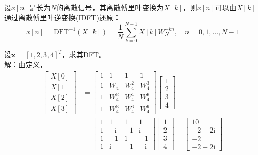 \begin{theorem}[离散傅里叶反演公式]\label{thm:DFT_inv}
    设$x[n]$是长为$N$的离散信号，其离散傅里叶变换为$X[k]$，则$x[n]$可以由$X[k]$通过离散傅里叶逆变换(IDFT)还原：
    \[x[n]=\mathrm{DFT}^{-1}(X[k])=\frac{1}{N}\sum_{k=0}^{N-1}X[k]W_N^{-kn},\quad n=0,1,\dots,N-1\]
\end{theorem}

\begin{example}
    设$\mathbf{x}=[1,2,3,4]^T$，求其DFT。\\
    解：由定义，
    \begin{align*}
        \begin{bmatrix}
            X[0]  \\
            X[1]  \\
            X[2]  \\
            X[3]
        \end{bmatrix}&=\begin{bmatrix}1 & 1 & 1 & 1 \\
        1 & W_4 & W_4^{2} & W_4^{3} \\
        1 & W_4^{2} & W_4^{4} & W_4^{6} \\
        1 & W_4^{3} & W_4^{6} & W_4^{9}
        \end{bmatrix}\begin{bmatrix}
            1  \\
            2  \\
            3  \\
            4
        \end{bmatrix}\\
        &=\begin{bmatrix}
        1 & 1 & 1 & 1 \\
        1 & -\mathrm{i} & -1 & \mathrm{i} \\
        1 & -1 & 1 & -1 \\
        1 & \mathrm{i} & -1 & -\mathrm{i}
        \end{bmatrix}\begin{bmatrix}
            1  \\
            2  \\
            3  \\
            4
        \end{bmatrix}=\begin{bmatrix}
            10  \\
            -2+2\mathrm{i}  \\
            -2  \\
            -2-2\mathrm{i}
        \end{bmatrix}
    \end{align*}
\end{example}

